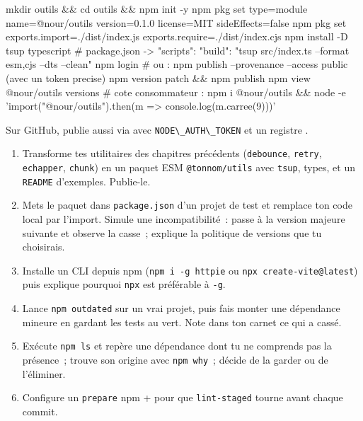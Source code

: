 \begin{terminal}
mkdir outils && cd outils && npm init -y
npm pkg set type=module name=@nour/outils version=0.1.0 license=MIT sideEffects=false
npm pkg set exports.import=./dist/index.js exports.require=./dist/index.cjs
npm install -D tsup typescript
# package.json -> "scripts": { "build": "tsup src/index.ts --format esm,cjs --dts --clean" }
npm login          # ou : npm publish --provenance --access public (avec un token precise)
npm version patch && npm publish
npm view @nour/outils versions
# cote consommateur :
npm i @nour/outils && node -e 'import("@nour/outils").then(m => console.log(m.carree(9)))'
\end{terminal}

Sur GitHub, publie aussi via 
avec \verb|NODE\_AUTH\_TOKEN| et un registre .

\begin{exercice}
\begin{enumerate}
  \item Transforme tes utilitaires des chapitres pr\'ec\'edents (\verb|debounce|, \verb|retry|,
        \verb|echapper|, \verb|chunk|) en un paquet ESM \verb|@tonnom/utils| avec
        \verb|tsup|, types, et un \verb|README| d'exemples. Publie-le.
  \item Mets le paquet dans \verb|package.json| d'un projet de test et remplace ton code
        local par l'import. Simule une incompatibilit\'e~: passe \`a la version majeure suivante et
        observe la casse~; explique la politique de versions que tu choisirais.
  \item Installe un CLI depuis npm (\verb|npm i -g httpie| ou \verb|npx create-vite@latest|) puis
        explique pourquoi \verb|npx| est pr\'ef\'erable \`a \verb|-g|.
  \item Lance \verb|npm outdated| sur un vrai projet, puis fais monter une d\'ependance mineure
        en gardant les tests au vert. Note dans ton carnet ce qui a cass\'e.
  \item Ex\'ecute \verb|npm ls| et rep\`ere une d\'ependance dont tu ne comprends pas la pr\'esence~;
        trouve son origine avec \verb|npm why|~; d\'ecide de la garder ou de l'\'eliminer.
  \item Configure un \verb|prepare| npm + 
        pour que \verb|lint-staged| tourne avant chaque commit.
\end{enumerate}
\end{exercice}


